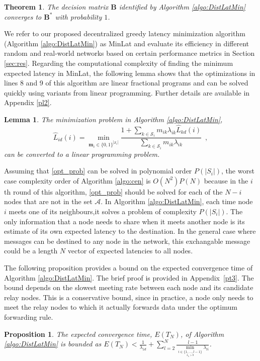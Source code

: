 \documentclass[journal,onecolumn,11pt]{IEEEtran}
\theoremstyle{plain}
\newtheorem{theorem}{Theorem}
\newtheorem{lemma}{Lemma}
\newtheorem{proposition}{Proposition}
\theoremstyle{definition}
\begin{document}
\begin{theorem}\label{theorem3}
The decision matrix $\mathbf{B}$ identified by Algorithm \ref{algo:DistLatMin} converges to $\mathbf{B}^*$ with probability $1$.
\end{theorem}


We refer to our proposed decentralized greedy latency minimization algorithm (Algorithm \ref{algo:DistLatMin}) as MinLat and evaluate its efficiency in different random and real-world networks based on certain performance metrics in Section \ref{sec:res}. Regarding the computational complexity of finding the minimum expected latency in MinLat, the following lemma shows that the optimizations in lines 8 and 9 of this algorithm are linear fractional programs and can be solved quickly using variants from linear programming. Further details are available in Appendix \ref{pl2}. 

\begin{lemma} \label{lem2}
The minimization problem in Algorithm \ref{algo:DistLatMin},
\begin{equation}\label{opt_prob}
\widehat{L}_{id}(i)=\min_{\mathbf{m}_i\in
  {\{0,1\}}^{|\mathcal{S}_i|}}\frac{1+\sum_{k \in \mathcal{S}_i}
  m_{ik} \lambda_{ik} \widehat{L}_{kd}(i)}{\sum_{k \in \mathcal{S}_i}
  m_{ik} \lambda_{ik}} \,\,\,,
\end{equation}
can be converted to a linear programming problem.
\end{lemma}
Assuming that \eqref{opt_prob} can be solved in polynomial order
$P(|S_i|)$, the worst case complexity order of Algorithm
\ref{algo:cen} is $O(N^2)P(N)$ because in the $i$th round of this
algorithm, \eqref{opt_prob} should be solved for each of the $N-i$
nodes that are not in the set $\mathcal{A}$. In Algorithm
\ref{algo:DistLatMin}, each time node $i$ meets one of its
neighbours,it solves a problem of complexity $P(|S_i|)$. The only
information that a node needs to share when it meets another node is
its estimate of its own expected latency to the destination. In the
general case where messages can be destined to any node in the
network, this exchangable message could be a length $N$ vector of
expected latencies to all nodes.

The following proposition provides a
bound on the expected convergence time of Algorithm
\ref{algo:DistLatMin}. The brief proof is provided in
Appendix~\ref{pt3}. The bound depends on the slowest meeting rate
between each node and its candidate relay nodes. This is a
conservative bound, since in practice, a node only needs to meet the
relay nodes to which it actually forwards data under the optimum forwarding rule.
\begin{proposition}\label{prop1}
The expected convergence time, $E(T_N)$, of Algorithm
\ref{algo:DistLatMin} is bounded as 
$
E(T_N)< \frac{1}{\lambda_{1d}} + \sum_{l=2}^{N} \frac{l-1}{\underset{\underset{\lambda_{li}>0}{i
      \in \{1,\dots,l-1\}}}{\min} \lambda_{li}}$.
\end{proposition}
\end{document}
